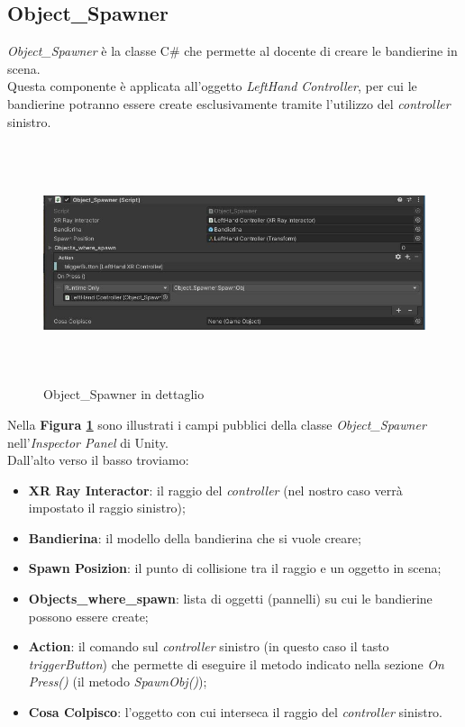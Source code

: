\subsection{Object\_Spawner}
\textit{Object\_Spawner} è la classe C\# che permette al docente di creare le bandierine in scena.\\Questa componente è applicata all'oggetto \textit{LeftHand Controller}, per cui le bandierine potranno essere create esclusivamente tramite l'utilizzo del \textit{controller} sinistro.
\begin{figure}[H]
    \centering
    \includegraphics[width = 16cm, height = 7cm]{Immagini/Object_spawner.jpg}
    \caption{Object\_Spawner in dettaglio}
    \label{fig:4.5}
\end{figure}
\hspace{-0.6cm}Nella \textbf{Figura \ref{fig:4.5}} sono illustrati i campi pubblici della classe \textit{Object\_Spawner} nell'\textit{Inspector Panel} di Unity.
\\Dall'alto verso il basso troviamo:
\begin{itemize}
    \item \textbf{XR Ray Interactor}: il raggio del \textit{controller} (nel nostro caso verrà impostato il raggio sinistro);
    \item \textbf{Bandierina}: il modello della bandierina che si vuole creare;
    \item \textbf{Spawn Posizion}: il punto di collisione tra il raggio e un oggetto in scena;
    \item \textbf{Objects\_where\_spawn}: lista di oggetti (pannelli) su cui le bandierine possono essere create;
    \item \textbf{Action}: il comando sul \textit{controller} sinistro (in questo caso il tasto \textit{triggerButton}) che permette di eseguire il metodo indicato nella sezione \textit{On Press()} (il metodo \textit{SpawnObj()});
    \item \textbf{Cosa Colpisco}: l'oggetto con cui interseca il raggio del \textit{controller} sinistro.
\end{itemize}
